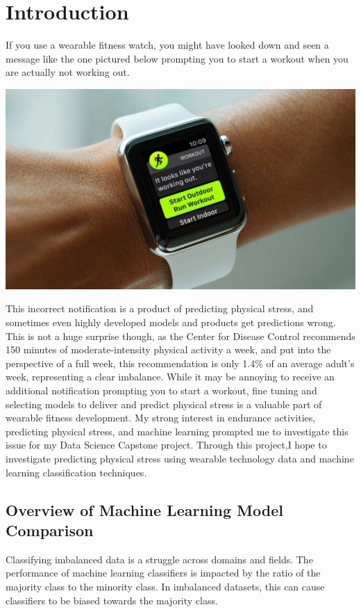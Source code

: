 \documentclass{article}
\begin{document}
\section{Introduction}
If you use a wearable fitness watch, you might have looked down and seen a message like the one pictured below prompting you to start a workout when you are actually not working out. 
\begin{center}
    \includegraphics[scale = .28]{images/Apple_Watch_Workput_Detection_banner-800x457.jpeg}
    \cite{appleWatch}
\end{center}
This incorrect notification is a product of predicting physical stress, and sometimes even highly developed models and products get predictions wrong. This is not a huge surprise though, as the Center for Disease Control recommends 150 minutes of moderate-intensity physical activity a week, and put into the perspective of a full week, this recommendation is only 1.4\% of an average adult’s week, representing a clear imbalance. While it may be annoying to receive an additional notification prompting you to start a workout, fine tuning and selecting models to deliver and predict physical stress is a valuable part of wearable fitness development. My strong interest in endurance activities, predicting physical stress, and machine learning prompted me to investigate this issue for my Data Science Capstone project. Through this project,I hope to investigate predicting physical stress using wearable technology data and machine learning classification techniques. 


\subsection{Overview of Machine Learning Model Comparison}

Classifying imbalanced data is a struggle across domains and fields. The performance of machine learning classifiers is impacted by the ratio of the majority class to the minority class. In imbalanced datasets, this can cause classifiers to be biased towards the majority class.
\end{document}
